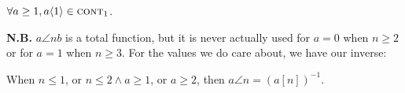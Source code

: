 \begin{col} \label{col: inv-hyperop-1-contr1}
$\forall a \ge 1, a\langle 1\rangle \in \text{\scshape{cont}}_1$.
\end{col}
\textbf{N.B.} $a\angle{n}b$ is a total function, but it is never actually used for $a = 0$ when $n \ge 2$ or for $a=1$ when $n \ge 3$. For the values
we do care about, we have our inverse:
\begin{thm} \label{thm: inv-hyperop-correct}
	\href{https://github.com/inv-ack/inv-ack/blob/7270e64a2600b771f2b1b1b151f7d13fb2ae6c97/applications.v#L72-L98}{\coq}
When $n\le 1$, or $n \le 2 \wedge a\ge 1$, or $a\ge 2$, then
$a\angle{n} = \left(a[n]\right)^{-1}$.
\end{thm}
